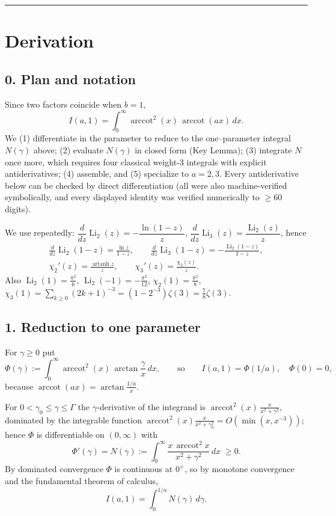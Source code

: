 \documentclass[11pt]{article}
\theoremstyle{remark}
\begin{document}
\begin{center}\rule{0.4\textwidth}{0.4pt}\end{center}

\section*{Derivation}

\subsection*{0. Plan and notation}

Since two factors coincide when $b=1$,
\[I(a,1)=\int_0^\infty\operatorname{arccot}^2(x)\,\operatorname{arccot}(ax)\,dx .\]
We (1) differentiate in the parameter to reduce to the one--parameter integral $N(\gamma)$ above; (2) evaluate $N(\gamma)$ in closed form (Key Lemma); (3) integrate $N$ once more, which requires four classical weight-3 integrals with explicit antiderivatives; (4) assemble, and (5) specialize to $a=2,3$. Every antiderivative below can be checked by direct differentiation (all were also machine-verified symbolically, and every displayed identity was verified numerically to $\ge 60$ digits).

We use repeatedly: $\dfrac{d}{dz}\operatorname{Li}_2(z)=-\dfrac{\ln(1-z)}{z}$, $\dfrac{d}{dz}\operatorname{Li}_3(z)=\dfrac{\operatorname{Li}_2(z)}{z}$, hence
\[\begin{gathered}
\frac{d}{dz}\operatorname{Li}_2(1-z)=\frac{\ln z}{1-z},\qquad
\frac{d}{dz}\operatorname{Li}_3(1-z)=-\frac{\operatorname{Li}_2(1-z)}{1-z},\\
\chi_2'(z)=\frac{\operatorname{artanh}z}{z},\qquad \chi_3'(z)=\frac{\chi_2(z)}{z}.
\end{gathered}\]
Also $\operatorname{Li}_2(1)=\frac{\pi^2}{6}$, $\operatorname{Li}_2(-1)=-\frac{\pi^2}{12}$, $\chi_2(1)=\frac{\pi^2}{8}$, $\chi_3(1)=\sum_{k\ge0}(2k+1)^{-3}=(1-2^{-3})\zeta(3)=\frac78\zeta(3)$.

\subsection*{1. Reduction to one parameter}

For $\gamma\ge 0$ put
\[\Phi(\gamma):=\int_0^\infty\operatorname{arccot}^2(x)\,\arctan\frac{\gamma}{x}\,dx,
\qquad\text{so}\qquad I(a,1)=\Phi(1/a),\quad \Phi(0)=0 ,\]
because $\operatorname{arccot}(ax)=\arctan\frac{1/a}{x}$.

For $0<\gamma_0\le\gamma\le\Gamma$ the $\gamma$-derivative of the integrand is
$\operatorname{arccot}^2(x)\,\frac{x}{x^2+\gamma^2}$, dominated by the integrable function
$\operatorname{arccot}^2(x)\frac{x}{x^2+\gamma_0^2}=O(\min(x,x^{-3}))$; hence $\Phi$ is differentiable on $(0,\infty)$ with
\[\Phi'(\gamma)=N(\gamma):=\int_0^\infty\frac{x\,\operatorname{arccot}^2x}{x^2+\gamma^2}\,dx\;\ge 0 .\]
By dominated convergence $\Phi$ is continuous at $0^+$, so by monotone convergence and the fundamental theorem of calculus,
\begin{equation}
I(a,1)=\int_0^{1/a}N(\gamma)\,d\gamma. \tag{1.1}
\end{equation}
\end{document}
